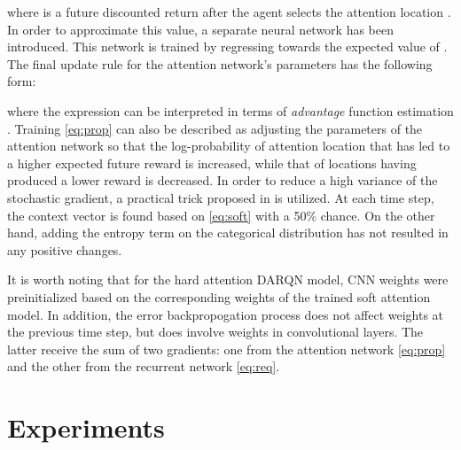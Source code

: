 \documentclass{article} \usepackage{nips15submit_e,times}
\begin{document}
where  is a future discounted return after the agent selects the attention location . In order to approximate this value, 
a separate neural network  has been introduced. This network is trained by regressing towards the expected value of . 
The final update rule for the attention network's parameters has the following form:

where the expression  can be interpreted in terms of \emph{advantage} function estimation \cite{schulman2015high}. Training \eqref{eq:prop} can also be described \cite{mnih2014ram} as adjusting the parameters  of the attention network so that the log-probability of attention location  that has led to a higher expected future reward is increased, while that of locations having produced a lower reward is decreased. In order to reduce a high variance of the stochastic gradient, a practical trick proposed in \cite{xu2015show} is utilized. At each time step, the context vector  is found based on \eqref{eq:soft} with a 50\% chance. On the other hand, adding the entropy term on the categorical distribution has not resulted in any positive changes.

It is worth noting that for the hard attention DARQN model, CNN weights were preinitialized based on the corresponding weights of the trained soft attention model. In addition, the error backpropogation process does not affect weights at the previous time step, but does involve weights in convolutional layers. The latter receive the sum of two gradients: one from the attention network \eqref{eq:prop} and the other from the recurrent network \eqref{eq:req}.

\section{Experiments}
\label{sec:exp}

	
	
\end{document}
